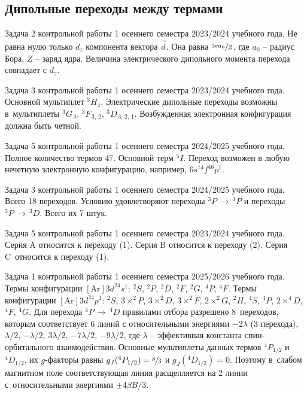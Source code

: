 \par
\newpage

\subsection{Дипольные переходы между термами}
 Задача 2 контрольной работы 1 осеннего семестра 2023/2024 учебного года. Не равна нулю только $d_z$ компонента вектора $\vec d$. Она равна $\sfrac{3ea_0}{Z}$, где $a_0$ – радиус Бора, $Z$ – заряд ядра. Величина электрического дипольного момента перехода совпадает с $d_z$.\par
{} Задача 3 контрольной работы 1 осеннего семестра 2023/2024 учебного года. Основной мультиплет $^3H_4$. Электрические дипольные переходы возможны в~мультиплеты $^3G_{\,3}$, $^3F_{\,3,\,2}$, $^3D_{\,3,\,2,\,1}$. Возбужденная электронная конфигурация должна быть четной.\par
{} Задача 5 контрольной работы 1 осеннего семестра 2024/2025 учебного года. Полное количество термов 47. Основной терм $^5I$. Переход возможен в любую нечетную электронную конфигурацию, например, $6s^14f^46p^1$.\par
{} Задача 3 контрольной работы 1 осеннего семестра 2024/2025 учебного года. Всего 18 переходов. Условию удовлетворяют переходы $^3P\, \rightarrow\, ^3P$ и переходы $^3P\, \rightarrow\, ^3D$. Всего их 7 штук.\par
{} Задача 5 контрольной работы 1 осеннего семестра 2023/2024 учебного года. Серия A относится к переходу (1). Серия B относится к переходу (2). Серия C~относится к переходу (1). \par
{} Задача 1 контрольной работы 1 осеннего семестра 2025/2026 учебного года. Термы конфигурации $[\text{Ar}]3d^24s^1$: $^2S$, $^2P$, $^2D$, $^2F$, $^2G$, $^4P$, $^4F$. Термы конфигурации $[\text{Ar}]3d^24p^1$: $^2S$, $3 \times ^2P$, $3 \times ^2D$, $3 \times ^2F$, $2 \times ^2G$, $^2H$, $^4S$, $^4P$, $2 \times ^4D$, $^4F$, $^4G$. Для перехода $^4P \,\rightarrow\,^4D$ правилами отбора разрешено 8~переходов, которым соответствует 6 линий с относительными энергиями $-2\lambda$ (3 перехода), $\lambda/2$, $-\lambda/2$, $3\lambda/2$, $-7\lambda/2$, $-9\lambda/2$, где $\lambda$ – эффективная константа спин-орбитального взаимодействия. Основные мультиплеты данных термов $^4P_{1/2}$ и~$^4D_{1/2}$, их $g$-факторы равны $g_J(^4P_{1/2})=\sfrac83$ и $g_J(^4D_{1/2})=0$. Поэтому в~слабом магнитном поле соответствующая линия расщепляется на 2 линии с~относительными энергиями $\pm 4\beta B/3$.\par
\newpage

